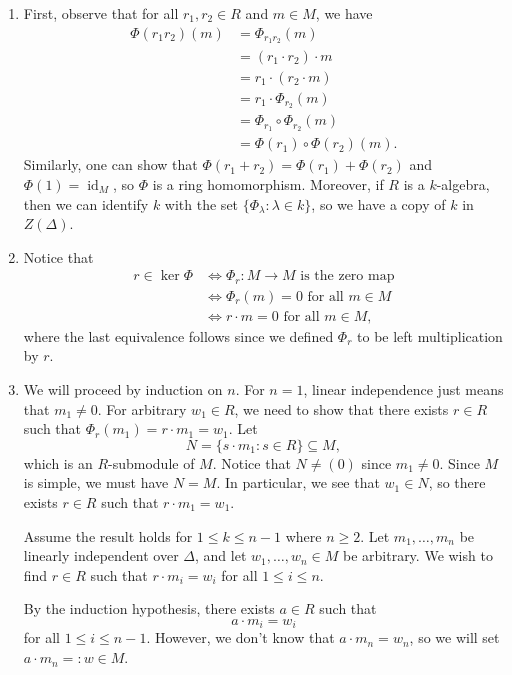 \documentclass[10pt]{article}
\numberwithin{equation}{section}
\DeclareMathOperator{\id}{id}
\theoremstyle{newstyle}
\begin{document}
\begin{enumerate}[(1)]
    \item First, observe that for all $r_1, r_2 \in R$ and $m \in M$, we have
    \begin{align*}
        \Phi(r_1r_2)(m) &= \Phi_{r_1r_2}(m) \\
        &= (r_1 \cdot r_2) \cdot m \\
        &= r_1 \cdot (r_2 \cdot m) \\
        &= r_1 \cdot \Phi_{r_2}(m) \\
        &= \Phi_{r_1} \circ \Phi_{r_2}(m) \\
        &= \Phi(r_1) \circ \Phi(r_2)(m).
    \end{align*}
    Similarly, one can show that $\Phi(r_1 + r_2) = \Phi(r_1) + \Phi(r_2)$ and $\Phi(1) = \id_M$, so 
    $\Phi$ is a ring homomorphism. Moreover, if $R$ is a $k$-algebra, then we can identify 
    $k$ with the set $\{\Phi_\lambda : \lambda \in k\}$, so we have a copy of $k$ in $Z(\Delta)$. 
    
    \item Notice that 
    \begin{align*}
        r \in \ker\Phi &\iff \Phi_r : M \to M \text{ is the zero map} \\
        &\iff \Phi_r(m) = 0 \text{ for all $m \in M$} \\
        &\iff r \cdot m = 0 \text{ for all $m \in M$,}
    \end{align*}
    where the last equivalence follows since we defined $\Phi_r$ to be left multiplication by $r$.
    
    \item We will proceed by induction on $n$. For $n = 1$, linear independence just means that 
    $m_1 \neq 0$. For arbitrary $w_1 \in R$, we need to show that there exists $r \in R$ such that 
    $\Phi_r(m_1) = r \cdot m_1 = w_1$. Let 
    \[ N = \{s \cdot m_1 : s \in R\} \subseteq M, \]
    which is an $R$-submodule of $M$. Notice that $N \neq (0)$ since $m_1 \neq 0$. Since $M$ is 
    simple, we must have $N = M$. In particular, we see that $w_1 \in N$, so there exists 
    $r \in R$ such that $r \cdot m_1 = w_1$. 
    
    Assume the result holds for $1 \leq k \leq n-1$ where $n \geq 2$. Let $m_1, \dots, m_n$ be 
    linearly independent over $\Delta$, and let $w_1, \dots, w_n \in M$ be arbitrary. We wish to find 
    $r \in R$ such that $r \cdot m_i = w_i$ for all $1 \leq i \leq n$. 
    
    By the induction hypothesis, there exists $a \in R$ such that 
    \[ a \cdot m_i = w_i \]
    for all $1 \leq i \leq n-1$. However, we don't know that $a \cdot m_n = w_n$, so we will set 
    $a \cdot m_n =: w \in M$. 
    

\end{enumerate}
\end{document}
